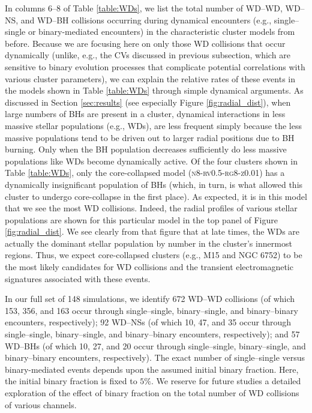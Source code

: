 \documentclass[twocolumn,tighten]{aastex63}
\begin{document}
In columns 6--8 of Table \ref{table:WDs}, we list the total number of WD--WD, WD--NS, and WD--BH collisions occurring during dynamical encounters (e.g., single--single or binary-mediated encounters) in the characteristic cluster models from before. Because we are focusing here on only those WD collisions that occur dynamically (unlike, e.g., the CVs discussed in previous subsection, which are sensitive to binary evolution processes that complicate potential correlations with various cluster parameters), we can explain the relative rates of these events in the models shown in Table \ref{table:WDs} through simple dynamical arguments. As discussed in Section \ref{sec:results} (see especially Figure \ref{fig:radial_dist}), when large numbers of BHs are present in a cluster, dynamical interactions in less massive stellar populations (e.g., WDs), are less frequent simply because the less massive populations tend to be driven out to larger radial positions due to BH burning. Only when the BH population decreases sufficiently do less massive populations like WDs become dynamically active. Of the four clusters shown in Table \ref{table:WDs}, only the core-collapsed model (\textsc{n8-rv0.5-rg8-z0.01}) has a dynamically insignificant population of BHs (which, in turn, is what allowed this cluster to undergo core-collapse in the first place). As expected, it is in this model that we see the most WD collisions.
Indeed, the radial profiles of various stellar populations are shown for this particular model in the top panel of Figure \ref{fig:radial_dist}. We see clearly from that figure that at late times, the WDs are actually the dominant stellar population by number in the cluster's innermost regions. Thus, we expect core-collapsed clusters (e.g., M15 and NGC 6752) to be the most likely candidates for WD collisions and the  transient electromagnetic signatures associated with these events.

In our full set of 148 simulations, we identify 672 WD--WD collisions (of which 153, 356, and 163 occur through single--single, binary--single, and binary--binary encounters, respectively); 92 WD--NSs (of which 10, 47, and 35 occur through single--single, binary--single, and binary--binary encounters, respectively); and 57 WD--BHs (of which 10, 27, and 20 occur through single--single, binary--single, and binary--binary encounters, respectively). The exact number of single--single versus binary-mediated events depends upon the assumed initial binary fraction. Here, the initial binary fraction is fixed to $5\%$. We reserve for future studies a detailed exploration of the effect of binary fraction on the total number of WD collisions of various channels.
\end{document}
